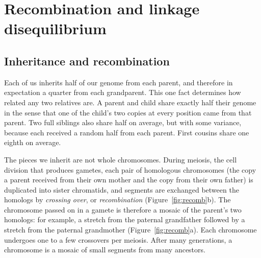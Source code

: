 \section{Recombination and linkage disequilibrium}
\label{sec:ld}

\subsection{Inheritance and recombination}

Each of us inherits half of our genome from each parent, and therefore in expectation a quarter from each grandparent. This one fact determines how related any two relatives are. A parent and child share exactly half their genome in the sense that one of the child's two copies at every position came from that parent. Two full siblings also share half on average, but with some variance, because each received a random half from each parent. First cousins share one eighth on average.

The pieces we inherit are not whole chromosomes. During meiosis, the cell division that produces gametes, each pair of homologous chromosomes (the copy a parent received from their own mother and the copy from their own father) is duplicated into sister chromatids, and segments are exchanged between the homologs by \emph{crossing over}, or \emph{recombination} (Figure~\ref{fig:recomb}b). The chromosome passed on in a gamete is therefore a mosaic of the parent's two homologs: for example, a stretch from the paternal grandfather followed by a stretch from the paternal grandmother (Figure~\ref{fig:recomb}a). Each chromosome undergoes one to a few crossovers per meiosis. After many generations, a chromosome is a mosaic of small segments from many ancestors.

